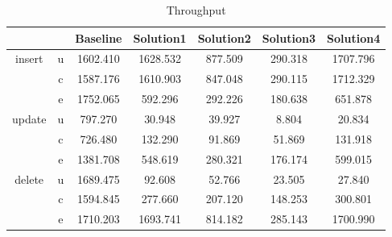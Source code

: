 \begin{table}[h]
\newcommand{\B}[1]{\colorbox{light-gray}{#1}}
 \centering
\caption{Throughput}\label{t:}
\begin{tabular}{ccccccc}
\toprule
&&Baseline & Solution1 & Solution2 & Solution3 & Solution4\\
\midrule
\multirow{3}{*}{insert} & u & 1602.410 & 1628.532 & 877.509 & 290.318 & 1707.796\\
 & c & 1587.176 & 1610.903 & 847.048 & 290.115 & 1712.329\\
 & e & 1752.065 & 592.296 & 292.226 & 180.638 & 651.878\\
\midrule
\multirow{3}{*}{update} & u & 797.270 & 30.948 & 39.927 & 8.804 & 20.834\\
 & c & 726.480 & 132.290 & 91.869 & 51.869 & 131.918\\
 & e & 1381.708 & 548.619 & 280.321 & 176.174 & 599.015\\
\midrule
\multirow{3}{*}{delete} & u & 1689.475 & 92.608 & 52.766 & 23.505 & 27.840\\
 & c & 1594.845 & 277.660 & 207.120 & 148.253 & 300.801\\
 & e & 1710.203 & 1693.741 & 814.182 & 285.143 & 1700.990\\
\bottomrule
\end{tabular}
\end{table}



